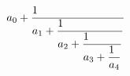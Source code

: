 \documentclass[12pt]{article}
\newcommand{\D}{\displaystyle}
\begin{document}
\[ a_0 + \frac{1\hfill}{\D a_1 
	 + \frac{1\hfill}{\D a_2
	   + \frac{1\hfill}{\D a_3
	     + \frac{1\hfill}{a_4}}}} \]
\end{document}
